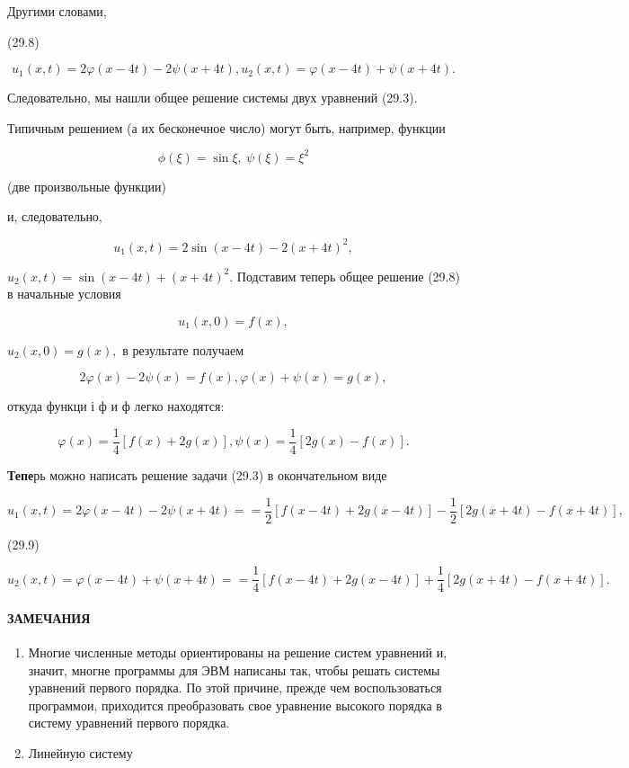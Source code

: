 \documentclass[
  ukrainian,
]{article}
\begin{document}
Другими словами,

(29.8)

\[
u_1(x, t) = 2\varphi(x-4t) - 2\psi(x+4t), u_2(x, t) = \varphi(x-4t) + \psi(x+4t).
\]

Следовательно, мы нашли общее решение системы двух уравнений (29.3).

Типичным решением (а их бесконечное число) могут быть, например, функции

\[
\phi(\xi) = \sin \xi, \ \psi(\xi) = \xi^2
\]

(две произвольные функции)

и, следовательно,

\[
u_1(x, t) = 2 \sin(x-4t) - 2(x+4t)^2,
\]

\(u_2(x, t) = \sin(x-4t) + (x+4t)^2.\) Подставим теперь общее решение
(29.8) в начальные условия

\[
u_1(x, 0) = f(x),
\]

\(u_2(x, 0) = g(x),\) в результате получаем

\[
2\varphi(x) - 2\psi(x) = f(x),
\varphi(x) + \psi(x) = g(x),
\]

откуда функци і ф и ф легко находятся:

\[
\varphi(x) = \frac{1}{4} \left[ f(x) + 2g(x) \right],
\psi(x) = \frac{1}{4} \left[ 2g(x) - f(x) \right].
\]

\textbf{Тепе}рь можно написать решение задачи (29.3) в окончательном
виде

\[
u_{1}(x, t) = 2\varphi(x-4t) - 2\psi(x+4t) =
= \frac{1}{2} \left[ f(x-4t) + 2g(x-4t) \right] - \frac{1}{2} \left[ 2g(x+4t) - f(x+4t) \right],
\]

(29.9)

\[
u_{2}(x, t) = \varphi(x-4t) + \psi(x+4t) =
= \frac{1}{4} \left[ f(x-4t) + 2g(x-4t) \right] + \frac{1}{4} \left[ 2g(x+4t) - f(x+4t) \right].
\]

\paragraph{ЗАМЕЧАНИЯ}\label{ux437ux430ux43cux435ux447ux430ux43dux438ux44f-5}

\begin{enumerate}
\def\labelenumi{\arabic{enumi}.}
\item
  Многие численные методы ориентированы на решение систем уравнений и,
  значит, многне программы для ЭВМ написаны так, чтобы решать системы
  уравнений первого порядка. По этой причине, прежде чем воспользоваться
  программои, приходится преобразовать свое уравнение высокого порядка в
  систему уравнений первого порядка.
\item
  Линейную систему
\end{enumerate}
\end{document}
